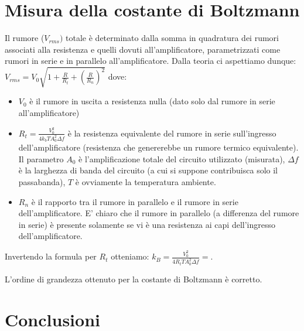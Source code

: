\documentclass[10pt,a4paper]{article}
\begin{document}
\section{Misura della costante di Boltzmann}
Il rumore ($V_{rms})$ totale è determinato dalla somma in quadratura dei rumori associati alla resistenza e quelli dovuti all'amplificatore, parametrizzati come rumori in serie e in parallelo all'amplificatore. Dalla teoria ci aspettiamo dunque: $V_{rms} = V_0 \sqrt{1+\frac{R}{R_t}+(\frac{R}{R_n})^2}$ dove:
\begin{itemize}
\item $V_0$ è il rumore in uscita a resistenza nulla (dato solo dal rumore in serie all'amplificatore)
\item $R_t = \frac{V_0^2}{4 k_b T A_0^2 \Delta f}$ è la resistenza equivalente del rumore in serie sull'ingresso dell'amplificatore (resistenza che genererebbe un rumore termico equivalente). Il parametro $A_0$ è l'amplificazione totale del circuito utilizzato (misurata), $\Delta f$ è la larghezza di banda del circuito (a cui si suppone contribuisca solo il passabanda), $T$ è ovviamente la temperatura ambiente.\\
\item $R_n$ è il rapporto tra il rumore in parallelo e il rumore in serie dell'amplificatore. E' chiaro che il rumore in parallelo (a differenza del rumore in serie) è presente solamente se vi è una resistenza ai capi dell'ingresso dell'amplificatore.\\ %
\end{itemize}


Invertendo la formula per $R_t$ otteniamo: $k_B = \frac{V_0^2}{4 R_t T A_0^2 \Delta f} = $.

L'ordine di grandezza ottenuto per la costante di Boltzmann è corretto.\\



\section{Conclusioni}
\end{document}
